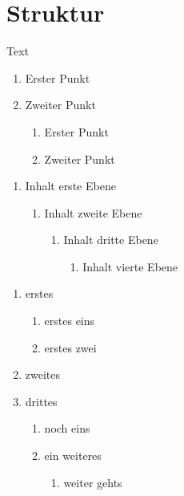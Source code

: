 \section{Struktur}
Text
\begin{enumerate} 
	\item Erster Punkt
	\item Zweiter Punkt
	\begin{enumerate} 
	\item Erster Punkt
	\item Zweiter Punkt
	\end{enumerate}
\end{enumerate}

\begin{enumerate}
\item Inhalt erste Ebene
\begin{enumerate}
\item Inhalt zweite Ebene
\begin{enumerate}
\item Inhalt dritte Ebene
\begin{enumerate}
\item Inhalt vierte Ebene
\end{enumerate}
\end{enumerate}
\end{enumerate}
\end{enumerate}


\begin{enumerate}
\item erstes
\begin{enumerate}
\item erstes eins
\item erstes zwei
\end{enumerate}
\item zweites
\item drittes
\begin{enumerate}
\item noch eins
\item ein weiteres
\begin{enumerate}
\item weiter gehts
\end{enumerate}
\end{enumerate}
\end{enumerate}
